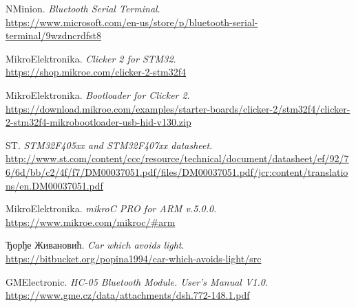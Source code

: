 


\begin{thebibliography}{15}
		NMinion.
		\emph{Bluetooth Serial Terminal}.\\
		\url{https://www.microsoft.com/en-us/store/p/bluetooth-serial-terminal/9wzdncrdfst8}
		
		MikroElektronika.
		\emph{Clicker 2 for STM32}.\\
		\url{https://shop.mikroe.com/clicker-2-stm32f4}
	
		MikroElektronika.
		\emph{Bootloader for Clicker 2}.\\
		\url{https://download.mikroe.com/examples/starter-boards/clicker-2/stm32f4/clicker-2-stm32f4-mikrobootloader-usb-hid-v130.zip}	
	
		ST.
		\emph{STM32F405xx and STM32F407xx datasheet}.\\
		\url{http://www.st.com/content/ccc/resource/technical/document/datasheet/ef/92/76/6d/bb/c2/4f/f7/DM00037051.pdf/files/DM00037051.pdf/jcr:content/translations/en.DM00037051.pdf}
		
		MikroElektronika.
		\emph{mikroC PRO for ARM v.5.0.0}.\\
		 \url{https://www.mikroe.com/mikroc/#arm}
		 
		 Ђорђе Живановић.
		\emph{Car which avoids light}.\\
		\url{https://bitbucket.org/popina1994/car-which-avoids-light/src}
		
		GMElectronic.
		\emph{HC-05 Bluetooth Module. User’s Manual V1.0}.\\
		\url{https://www.gme.cz/data/attachments/dsh.772-148.1.pdf}

\end{thebibliography}